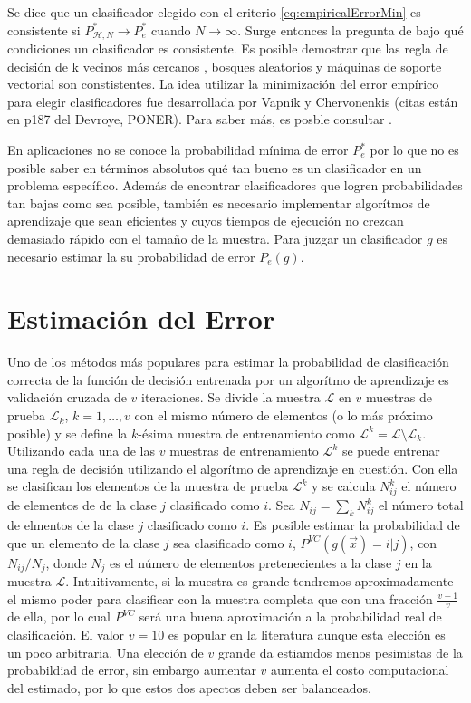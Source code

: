 \documentclass[letterpaper,12pt]{book}
\begin{document}
Se dice que un clasificador elegido con el criterio  \ref{eq:empiricalErrorMin} es consistente si $P_{\mathcal{H},N}^{*}\to P_e^*$ cuando $N\to\infty$.
Surge entonces la pregunta de bajo qué condiciones un clasificador es consistente. Es posible demostrar que las regla de decisión de k vecinos más cercanos \cite{devroye_probabilistic_1996}, bosques aleatorios \cite{biau_consistency_2008} y máquinas de soporte vectorial \cite{steinwart_consistency_2005} son constistentes. La idea utilizar la minimización del error empírico para elegir clasificadores fue desarrollada por Vapnik y Chervonenkis (citas están en p187 del Devroye, PONER). Para saber más, es posble consultar \cite{devroye_probabilistic_1996}.

En aplicaciones no se conoce la probabilidad mínima de error $P_e^*$ por lo que no es posible saber en términos absolutos qué tan bueno es un clasificador en un problema específico. Además de encontrar clasificadores que logren probabilidades tan bajas como sea posible, también es necesario implementar algorítmos de aprendizaje que sean eficientes y cuyos tiempos de ejecución no crezcan demasiado rápido con el tamaño de la muestra. Para juzgar un clasificador $g$ es necesario estimar la su probabilidad de error $P_e(g)$.

\section{Estimación del Error}

Uno de los métodos más populares para estimar la probabilidad de clasificación correcta de la función de decisión entrenada por un algorítmo de aprendizaje es validación cruzada de $v$ iteraciones. Se divide la muestra $\mathcal{L}$ en $v$ muestras de prueba $\mathcal{L}_{k}$, $k=1,\dots,v$ con el mismo número de elementos (o lo más próximo posible) y se define la $k$-ésima muestra de entrenamiento como $\mathcal{L}^{k} = \mathcal{L}\setminus \mathcal{L}_{k}$. Utilizando cada una de las $v$ muestras de entrenamiento $\mathcal{L}^{k}$  se puede entrenar una regla de decisión utilizando el algorítmo de aprendizaje en cuestión. Con ella se clasifican los elementos de la muestra de prueba $\mathcal{L}^{k}$ y se calcula $N_{ij}^{k}$ el número de elementos de de la clase $j$ clasificado como $i$. Sea $N_{ij}=\sum_{k}N_{ij}^{k}$ el número total de elmentos de la clase $j$ clasificado como $i$. Es posible estimar la probabilidad de que un elemento de la clase $j$ sea clasificado como $i$, $P^{VC}(g(\vec{x})=i|j)$, con $N_{ij}/N_{j}$, donde $N_{j}$ es el número de elementos pretenecientes a la clase $j$ en la muestra $\mathcal{L}$. Intuitivamente, si la muestra es grande tendremos aproximadamente el mismo poder para clasificar con la muestra completa que con una fracción $\frac{v-1}{v}$ de ella, por lo cual $P^{VC}$ será una buena aproximación a la probabilidad real de clasificación. El valor $v = 10$ es popular en la literatura aunque esta elección es un poco arbitraria. Una elección de $v$ grande da estiamdos menos pesimistas de la probabildiad de error, sin embargo aumentar $v$ aumenta el costo computacional del estimado, por lo que estos dos apectos deben ser balanceados.
\end{document}
